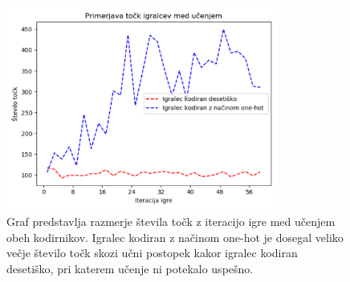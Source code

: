 \documentclass[a4paper, 12pt]{book}
\begin{document}

\begin{figure}[h!]
	\begin{center}
		\includegraphics[width=0.8\textwidth]{photos/onehot_numeric_score.pdf}
	\end{center}
	\caption{Graf predstavlja razmerje števila točk z iteracijo igre med učenjem obeh kodirnikov.
		Igralec kodiran z načinom one-hot je dosegal veliko večje število točk skozi učni postopek kakor igralec kodiran desetiško, pri katerem učenje ni potekalo uspešno.}
	\label{onehot_numeric_score}
\end{figure}
\end{document}
